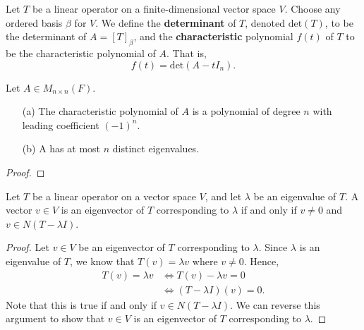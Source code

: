 \begin{definition}
    Let \( T  \) be a linear operator on a finite-dimensional vector space \( V  \). Choose any ordered basis \( \beta  \) for \( V  \). We define the \textbf{determinant} of \( T  \), denoted \( \text{det}(T) \), to be the determinant of \( A = [T]_{\beta}  \), and the \textbf{characteristic} polynomial \( f(t) \) of \( T  \) to be the characteristic polynomial of \( A  \). That is, 
    \[  f(t) = \text{det}(A - t {I}_{n}). \]
\end{definition}

\begin{theorem}
   Let \( A \in {M}_{n \times n}(F)  \).  
   \begin{enumerate}
       \item[(a)] The characteristic polynomial of \( A  \) is a polynomial of degree \( n  \) with leading coefficient \( (-1)^{n} \).
        \item[(b)] A has at most \( n  \) distinct eigenvalues.
   \end{enumerate}
\end{theorem}
\begin{proof}

\end{proof}

\begin{theorem}
    Let \( T  \) be a linear operator on a vector space \( V  \), and let \( \lambda  \) be an eigenvalue of \( T  \). A vector \( v \in V  \) is an eigenvector of \( T  \) corresponding to \( \lambda  \) if and only if \( v \neq 0  \) and \( v \in N(T - \lambda I ) \).
\end{theorem}
\begin{proof}
Let \( v \in V  \) be an eigenvector of \( T  \) corresponding to \( \lambda  \). Since \( \lambda  \) is an eigenvalue of \( T \), we know that \( T(v) = \lambda v  \) where \( v \neq 0  \). Hence,  
\begin{align*}
    T(v) = \lambda v &\iff T(v) - \lambda v = 0  \\
                     &\iff (T - \lambda I)(v) = 0. 
\end{align*}
Note that this is true if and only if \( v \in N(T - \lambda I)  \). We can reverse this argument to show that \( v \in V  \) is an eigenvector of \( T  \) corresponding to \( \lambda  \).
\end{proof}

